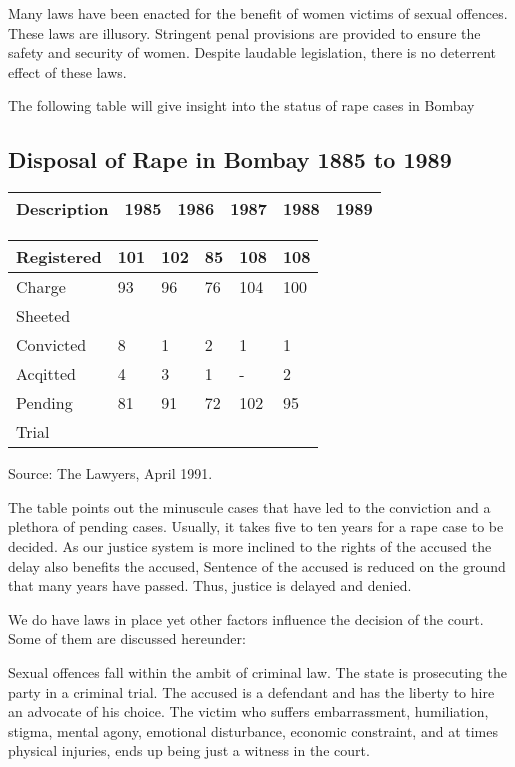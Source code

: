 \begin{multicols}{2}
\noi
Many laws have been enacted for the benefit of women victims of sexual offences.
These laws are illusory. Stringent penal provisions are provided to ensure the safety
and security of women. Despite laudable legislation, there is no deterrent effect of these
laws.

\noi
The following table will give insight into the status of rape cases in Bombay

\vspace{-.3cm}

\subsection*{Disposal of Rape in Bombay 1885 to 1989}
\begin{tabular}{|l|l|l|l|l|l|}
\hline
Description & 1985 & 1986 & 1987 & 1988 & 1989\\
\hline
\end{tabular}

\begin{tabular}{|l|l|l|l|l|l|}
\hline
Registered & 101 & 102 & 85 & 108 & 108\\
\hline
Charge & 93 & 96 & 76 & 104 & 100\\
Sheeted &   &    &    &     &    \\
\hline
Convicted & 8 & 1 & 2 & 1 &1 \\
\hline
Acqitted & 4 & 3 & 1 &-& 2\\
\hline
Pending & 81 & 91 & 72 & 102 & 95\\
Trial   &    &    &    &     &    \\
\hline
\end{tabular}

\noi
Source: The Lawyers, April 1991.

\noi
The table points out the minuscule cases that have led to the conviction and a plethora
of pending cases. Usually, it takes five to ten years for a rape case to be decided. As our
justice system is more inclined to the rights of the accused the delay also benefits the
accused, Sentence of the accused is reduced on the ground that many years have passed.
Thus, justice is delayed and denied.


\noi
We do have laws in place yet other factors influence the decision of the court. Some of
them are discussed hereunder:


\noi
Sexual offences fall within the ambit of criminal law. The state is prosecuting the party
in a criminal trial. The accused is a defendant and has the liberty to hire an advocate of
his choice. The victim who suffers embarrassment, humiliation, stigma, mental agony,
emotional disturbance, economic constraint, and at times physical injuries, ends up
being just a witness in the court.


\end{multicols}
